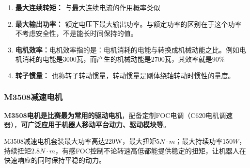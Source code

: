 \documentclass[UTF8]{article} %
\begin{document}
\begin{enumerate}
  \item \textbf{最大连续转矩：} 与最大连续电流的作用概率类似
  \item \textbf{最大输出功率：} 额定电压下最大输出功率。与额定功率的区别在于这个功率不考虑安全性，不是能长时间保持的值。
  \item \textbf{电机效率：}电机效率指的是：电机消耗的电能与转换成机械动能之比。例如电机消耗的电能是3000瓦，而产生的机械动能是2700瓦，其效率就是$90\%$
  \item \textbf{转子惯量：} 也称转子转动惯量，转动惯量是刚体绕轴转动时惯性的量度。
\end{enumerate}


\subsubsection{M3508减速电机}
\textbf{M3508电机是比赛最为常用的驱动电机}，配备定制FOC电调（C620电机调速器），\textbf{可广泛应用于机器人移动平台动力、驱动模块等}。

M3508减速电机套装最大功率高达220W，最大扭矩$5N \cdot m$；最大持续功率$150W$，持续扭矩$2.8N \cdot m$，有感FOC控制不论转速高低都能提供稳定的扭矩，让机器人在快速响应的同时保持平稳的动力。
\end{document}

